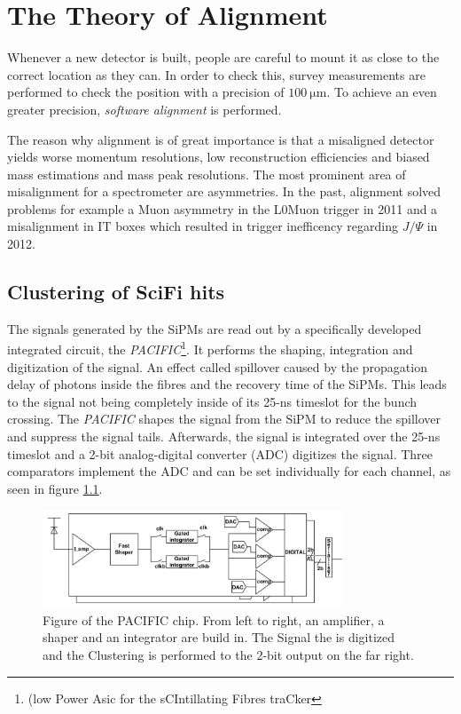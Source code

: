 \chapter{The Theory of Alignment}
\label{sec:alignTheory}

Whenever a new detector is built, people are careful to mount it as close to the correct location as they can. In order to check this, survey measurements are
performed to check the position with a precision of $\SI{100}{\micro\metre}$.
To achieve an even greater precision, \textit{software alignment} is performed.

The reason why alignment is of great importance is that a misaligned detector
yields worse momentum resolutions, low reconstruction efficiencies and biased mass estimations and mass peak resolutions.
The most prominent area of misalignment for a spectrometer are asymmetries.
In the past, alignment solved problems for example a Muon asymmetry in the
L0Muon trigger in 2011 and a misalignment in IT boxes which resulted in trigger inefficency regarding $J/\Psi$ in 2012.

\section{Clustering of SciFi hits}
\label{sec:clustering}

The signals generated by the SiPMs are read out by a specifically developed integrated circuit, the \textit{PACIFIC}\footnote{(low Power Asic for the sCIntillating Fibres traCker}\cite{readout}.
It performs the shaping, integration and digitization of the signal. An effect called spillover caused by the propagation delay of photons inside the fibres and the recovery time of the SiPMs. This leads to the signal not being completely inside of its 25-ns timeslot for the bunch crossing. The \textit{PACIFIC} shapes the signal from the SiPM to reduce the spillover and suppress the signal tails\cite{techreport}. Afterwards, the signal is integrated over the 25-ns timeslot and a 2-bit analog-digital converter (ADC) digitizes the signal.
Three comparators implement the ADC and can be set individually for each channel, as seen in figure \ref{fig:pac}.

\begin{figure}
    \centering
    \includegraphics[width=0.8\textwidth]{plots/pacific.png}
    \caption{Figure of the PACIFIC chip. From left to right, an amplifier, a shaper and an integrator are build in. The Signal the is digitized and the Clustering is performed to the 2-bit output on the far right.}
    \label{fig:pac}
\end{figure}

